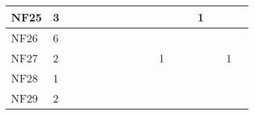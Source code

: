 \begin{table}[]
{\begin{tabular}{|l|l|l|l|l|l|l|l|l|l|l|l|l|l|l|l|l|}
NF25          & 3                                                     &                                                       &    &                                                       &    &                                                       &                                                       &    &    &                                                       &    &                                                  & 1                                                &    &    &    \\ \hline
NF26          & 6                                                     &                                                       &    &                                                       &    &                                                       &                                                       &    &    &                                                       &    &                                                  &                                                  &    &    &    \\ \hline
NF27          & 2                                                     &                                                       &    &                                                       &    &                                                       &                                                       &    &    & 1                                                     &    &                                                  &                                                  &    & 1  &    \\ \hline
NF28          & 1                                                     &                                                       &    &                                                       &    &                                                       &                                                       &    &    &                                                       &    &                                                  &                                                  &    &    &    \\ \hline
NF29          & 2                                                     &                                                       &    &                                                       &    &                                                       &                                                       &    &    &                                                       &    &                                                  &                                                  &    &    &    \\ \hline

\end{tabular}}
\end{table}
